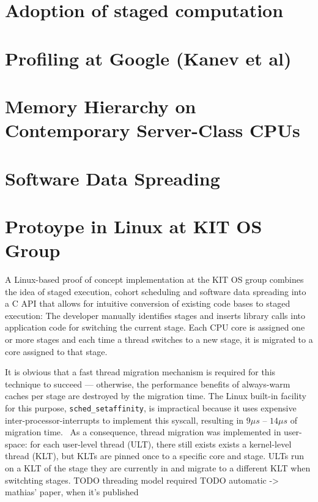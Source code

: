 \documentclass[12pt,a4paper]{book}
\begin{document}
\section{Adoption of staged computation}
\blindtext

\section{Profiling at Google (Kanev et al)}
\blindtext

\section{Memory Hierarchy on Contemporary Server-Class CPUs}
\blindtext

\section{Software Data Spreading}
\blindtext

\section{Protoype in Linux at KIT OS Group}
A Linux-based proof of concept implementation at the KIT OS group combines the idea of staged execution, cohort
scheduling and software data spreading into a C API that allows for intuitive conversion of existing code bases to
staged execution:
The developer manually identifies stages and inserts library calls into application code for switching the current stage.
Each CPU core is assigned one or more stages and each time a thread switches to a new stage, it is migrated to a core
assigned to that stage.

It is obvious that a fast thread migration mechanism is required for this technique to succeed
--- otherwise, the performance benefits of always-warm caches per stage are destroyed by the migration time.
The Linux built-in facility for this purpose, \texttt{sched\_setaffinity}, is impractical because it uses
expensive inter-processor-interrupts to implement this syscall, resulting in $9\mu s$ -- $14\mu s$ of migration time.~\cite{sodaspr}%
As a consequence, thread migration was implemented in user-space:
for each user-level thread (ULT), there still exists exists a kernel-level thread (KLT),
but KLTs are pinned once to a specific core and stage.
ULTs run on a KLT of the stage they are currently in and migrate to a different KLT when switchting stages.
TODO threading model required
TODO automatic -> mathias' paper, when it's published
\end{document}
